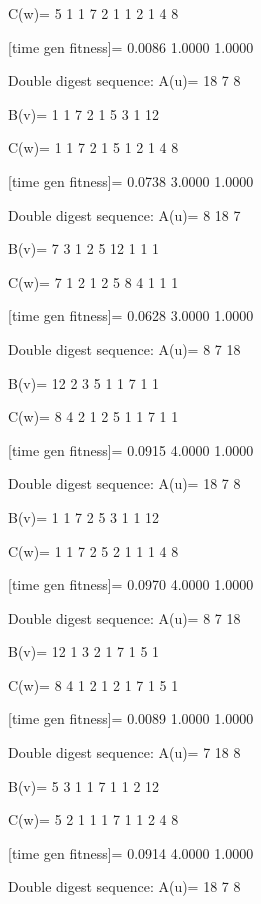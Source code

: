C(w)=
     5     1     1     7     2     1     1     2     1     4     8

[time gen fitness]=
    0.0086    1.0000    1.0000

Double digest sequence:
A(u)=
    18     7     8

B(v)=
     1     1     7     2     1     5     3     1    12

C(w)=
     1     1     7     2     1     5     1     2     1     4     8

[time gen fitness]=
    0.0738    3.0000    1.0000

Double digest sequence:
A(u)=
     8    18     7

B(v)=
     7     3     1     2     5    12     1     1     1

C(w)=
     7     1     2     1     2     5     8     4     1     1     1

[time gen fitness]=
    0.0628    3.0000    1.0000

Double digest sequence:
A(u)=
     8     7    18

B(v)=
    12     2     3     5     1     1     7     1     1

C(w)=
     8     4     2     1     2     5     1     1     7     1     1

[time gen fitness]=
    0.0915    4.0000    1.0000

Double digest sequence:
A(u)=
    18     7     8

B(v)=
     1     1     7     2     5     3     1     1    12

C(w)=
     1     1     7     2     5     2     1     1     1     4     8

[time gen fitness]=
    0.0970    4.0000    1.0000

Double digest sequence:
A(u)=
     8     7    18

B(v)=
    12     1     3     2     1     7     1     5     1

C(w)=
     8     4     1     2     1     2     1     7     1     5     1

[time gen fitness]=
    0.0089    1.0000    1.0000

Double digest sequence:
A(u)=
     7    18     8

B(v)=
     5     3     1     1     7     1     1     2    12

C(w)=
     5     2     1     1     1     7     1     1     2     4     8

[time gen fitness]=
    0.0914    4.0000    1.0000

Double digest sequence:
A(u)=
    18     7     8

